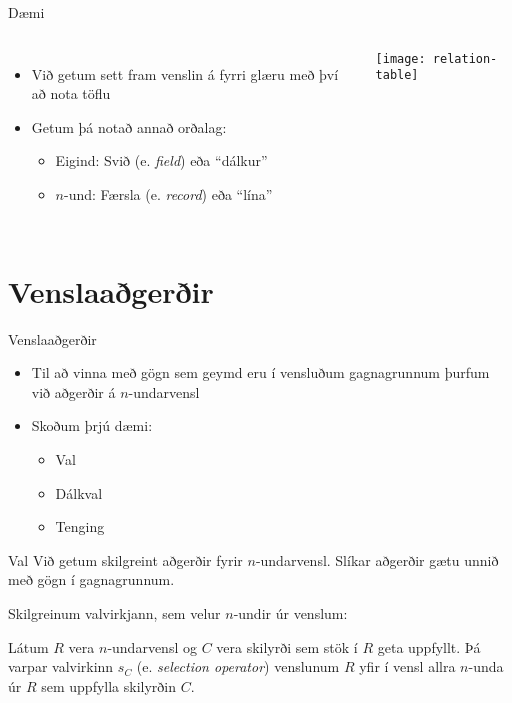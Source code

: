 \documentclass[handout]{beamer}
\begin{document}
\begin{frame}[fragile]{Dæmi}
\begin{columns}
\begin{itemize}
 \item Við getum sett fram venslin á fyrri glæru með því að nota töflu
 \item Getum þá notað annað orðalag:
 \begin{itemize}
  \item Eigind: Svið (e. \emph{field}) eða ``dálkur''
  \item $n$-und: Færsla (e. \emph{record}) eða ``lína''
 \end{itemize}
\end{itemize}
\begin{center}
\texttt{[image: relation-table]}
\end{center}
\end{columns}
\end{frame}

\section{Venslaaðgerðir}

\begin{frame}{Venslaaðgerðir}
    \begin{itemize}
        \item Til að vinna með gögn sem geymd eru í vensluðum gagnagrunnum þurfum við aðgerðir á $n$-undarvensl
        \item Skoðum þrjú dæmi:
        \begin{itemize}
            \item Val
            \item Dálkval
            \item Tenging
        \end{itemize}
    \end{itemize}
\end{frame}

\begin{frame}{Val}
Við getum skilgreint aðgerðir fyrir $n$-undarvensl. Slíkar aðgerðir gætu unnið með gögn í gagnagrunnum.

\vspace{0.5cm}
Skilgreinum valvirkjann, sem velur $n$-undir úr venslum: 
\begin{tcolorbox}[title=Valvirkinn]
Látum $R$ vera $n$-undarvensl og $C$ vera skilyrði sem stök í $R$ geta uppfyllt. Þá varpar valvirkinn $s_C$ (e. \emph{selection operator}) venslunum $R$ yfir í vensl allra $n$-unda úr $R$ sem uppfylla skilyrðin $C$.
\end{tcolorbox}
\end{frame}
\end{document}
